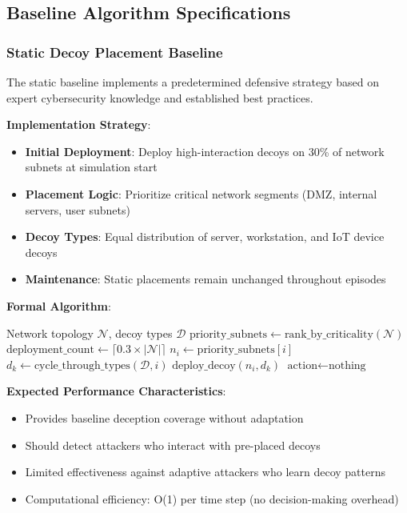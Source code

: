 \documentclass[12pt]{article}
\theoremstyle{definition}
\theoremstyle{plain}
\begin{document}
\subsection{Baseline Algorithm Specifications}

\subsubsection{Static Decoy Placement Baseline}

The static baseline implements a predetermined defensive strategy based on expert cybersecurity knowledge and established best practices.

\textbf{Implementation Strategy}:
\begin{itemize}
    \item \textbf{Initial Deployment}: Deploy high-interaction decoys on 30\% of network subnets at simulation start
    \item \textbf{Placement Logic}: Prioritize critical network segments (DMZ, internal servers, user subnets)
    \item \textbf{Decoy Types}: Equal distribution of server, workstation, and IoT device decoys
    \item \textbf{Maintenance}: Static placements remain unchanged throughout episodes
\end{itemize}

\textbf{Formal Algorithm}:
\begin{algorithm}[H]
\caption{Static Decoy Placement Baseline}
\label{alg:static_baseline}
\begin{algorithmic}[1]
\REQUIRE Network topology $\mathcal{N}$, decoy types $\mathcal{D}$
\STATE $\text{priority\_subnets} \leftarrow \text{rank\_by\_criticality}(\mathcal{N})$
\STATE $\text{deployment\_count} \leftarrow \lceil 0.3 \times |\mathcal{N}| \rceil$
    \STATE $n_i \leftarrow \text{priority\_subnets}[i]$
    \STATE $d_k \leftarrow \text{cycle\_through\_types}(\mathcal{D}, i)$
    \STATE $\text{deploy\_decoy}(n_i, d_k)$
\ENDFOR
{}
    \STATE $\text{action} \leftarrow \text{nothing}$ 
\ENDWHILE
\end{algorithmic}
\end{algorithm}

\textbf{Expected Performance Characteristics}:
\begin{itemize}
    \item Provides baseline deception coverage without adaptation
    \item Should detect attackers who interact with pre-placed decoys
    \item Limited effectiveness against adaptive attackers who learn decoy patterns
    \item Computational efficiency: O(1) per time step (no decision-making overhead)
\end{itemize}
\end{document}
